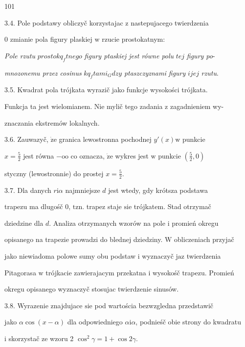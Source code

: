 \documentclass[a4paper,12pt]{article}
\begin{document}
101

3.4. Pole podstawy obliczyč korzystajac $\mathrm{z}$ nastepujacego twierdzenia

$0$ zmianie pola figury plaskiej $\mathrm{w}$ rzucie prostokatnym:

{\it Pole rzutu} $prostokq_{f}tnego$ {\it figury ptaskiej jest równe polu} $tej$ {\it figury po}-

{\it mnozonemu przez cosinus} $kq_{f}tami_{G}dzy$ {\it ptaszczyznami figury} $ijej$ {\it rzutu}.

3.5. Kwadrat pola trójkata wyrazič jako funkcje wysokości trójkata.

Funkcja ta jest wielomianem. Nie mylič tego zadania $\mathrm{z}$ zagadnieniem wy-

znaczania ekstremów lokalnych.

3.6. Zauwazyč, $\dot{\mathrm{z}}\mathrm{e}$ granica lewostronna pochodnej $y'(x) \mathrm{w}$ punkcie

$x = \displaystyle \frac{5}{2}$ jest równa $-\mathrm{o}\mathrm{o}$ co oznacza, $\dot{\mathrm{z}}\mathrm{e}$ wykres jest $\mathrm{w}$ punkcie $(\displaystyle \frac{5}{2},0)$

styczny (lewostronnie) do prostej $x=\displaystyle \frac{5}{2}.$

3.7. Dla danych $ r\mathrm{i}\alpha$ najmniejsze $d$ jest wtedy, gdy krótsza podstawa

trapezu ma dlugośč 0, $\mathrm{t}\mathrm{z}\mathrm{n}$. trapez staje $\mathrm{s}\mathrm{i}\mathrm{e}$ trójkatem. Stad otrzymač

dziedzine dla $d$. Analiza otrzymanych wzorów na pole $\mathrm{i}$ promień okregu

opisanego na trapezie prowadzi do blednej dziedziny. $\mathrm{W}$ obliczeniach przyjač

jako niewiadoma polowe sumy obu podstaw $\mathrm{i}$ wyznaczyč $\mathrm{j}\mathrm{a}\mathrm{z}$ twierdzenia

Pitagorasa $\mathrm{w}$ trójkacie zawierajacym przekatna $\mathrm{i}$ wysokośč trapezu. Promień

okregu opisanego wyznaczyč stosujac twierdzenie sinusów.

3.8. Wyrazenie znajdujace $\mathrm{s}\mathrm{i}\mathrm{e}$ pod wartościa bezwzgledna przedstawič

jako $\alpha\cos(x-\alpha)$ dla odpowiedniego $\alpha \mathrm{i}\alpha$, podnieśč obie strony do kwadratu

$\mathrm{i}$ skorzystač ze wzoru 2 $\cos^{2}\gamma=1+\cos 2\gamma.$
\end{document}
